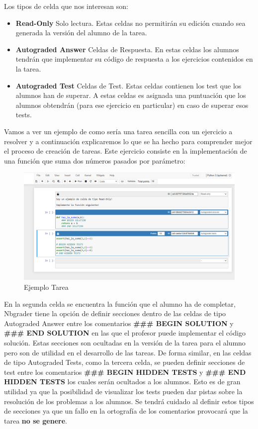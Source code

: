 Los tipos de celda que nos interesan son:
\begin{itemize}
\tightlist
\item \textbf{Read-Only} Solo lectura. Estas celdas no permitirán su edición cuando sea generada la versión del alumno de la tarea.
\item \textbf{Autograded Answer} Celdas de Respuesta. En estas celdas los alumnos tendrán que implementar su código de respuesta a los ejercicios contenidos en la tarea.
\item \textbf{Autograded Test} Celdas de Test. Estas celdas contienen los test que los alumnos han de superar. A estas celdas es asignada una puntuación que los alumnos obtendrán (para ese ejercicio en particular) en caso de superar esos tests. 
\end{itemize}

Vamos a ver un ejemplo de como sería una tarea sencilla con un ejercicio a resolver y a continuación explicaremos lo que se ha hecho para comprender mejor el proceso de creación de tareas. Este ejercicio consiste en la implementación de una función que suma dos números pasados por parámetro:

\begin{figure}[H]
\centering
\includegraphics[width=\textwidth]{img/imgs-memoria/EjemploTarea.PNG}
\caption{Ejemplo Tarea}
\end{figure}

En la segunda celda se encuentra la función que el alumno ha de completar, Nbgrader tiene la opción de definir secciones dentro de las celdas de tipo Autograded Answer entre los comentarios \textbf{\#\#\# BEGIN SOLUTION} y \textbf{\#\#\# END SOLUTION} en las que el profesor puede implementar el código solución. Estas secciones son ocultadas en la versión de la tarea para el alumno pero son de utilidad en el desarrollo de las tareas. De forma similar, en las celdas de tipo Autograded Tests, como la tercera celda, se pueden definir secciones de test entre los comentarios \textbf{\#\#\# BEGIN HIDDEN TESTS} y \textbf{\#\#\# END HIDDEN TESTS} los cuales serán ocultados a los alumnos. Esto es de gran utilidad ya que la posibilidad de visualizar los tests pueden dar pistas sobre la resolución de los problemas a los alumnos. Se tendrá cuidado al definir estos tipos de secciones ya que un fallo en la ortografía de los comentarios provocará que la tarea \textbf{no se genere}. 

